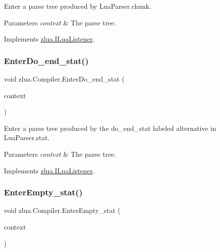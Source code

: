Enter a parse tree produced by Lua\+Parser.\+chunk. 


\begin{DoxyParams}{Parameters}
{\em context} & The parse tree.\\
\hline
\end{DoxyParams}


Implements \mbox{\hyperlink{interfacezlua_1_1_i_lua_listener_ade4db31c82992f111a3093cde12fd632}{zlua.\+I\+Lua\+Listener}}.

\mbox{\label{classzlua_1_1_compiler_a6995466e1f6349319b4b822ec3579e50}} 
\subsubsection{\texorpdfstring{Enter\+Do\+\_\+end\+\_\+stat()}{EnterDo\_end\_stat()}}
{\footnotesize\ttfamily void zlua.\+Compiler.\+Enter\+Do\+\_\+end\+\_\+stat (\begin{DoxyParamCaption}\item[{\mbox{[}\+Not\+Null\mbox{]} \mbox{\hyperlink{classzlua_1_1_lua_parser_1_1_do__end__stat_context}{Lua\+Parser.\+Do\+\_\+end\+\_\+stat\+Context}}}]{context }\end{DoxyParamCaption})}



Enter a parse tree produced by the {\ttfamily do\+\_\+end\+\_\+stat} labeled alternative in Lua\+Parser.\+stat. 


\begin{DoxyParams}{Parameters}
{\em context} & The parse tree.\\
\hline
\end{DoxyParams}


Implements \mbox{\hyperlink{interfacezlua_1_1_i_lua_listener_ad561e0f5feb33ca80ba5202ab0511bab}{zlua.\+I\+Lua\+Listener}}.

\mbox{\label{classzlua_1_1_compiler_a56016ed91d28fe91587f18764fc23b1c}} 
\subsubsection{\texorpdfstring{Enter\+Empty\+\_\+stat()}{EnterEmpty\_stat()}}
{\footnotesize\ttfamily void zlua.\+Compiler.\+Enter\+Empty\+\_\+stat (\begin{DoxyParamCaption}\item[{\mbox{[}\+Not\+Null\mbox{]} \mbox{\hyperlink{classzlua_1_1_lua_parser_1_1_empty__stat_context}{Lua\+Parser.\+Empty\+\_\+stat\+Context}}}]{context }\end{DoxyParamCaption})}



